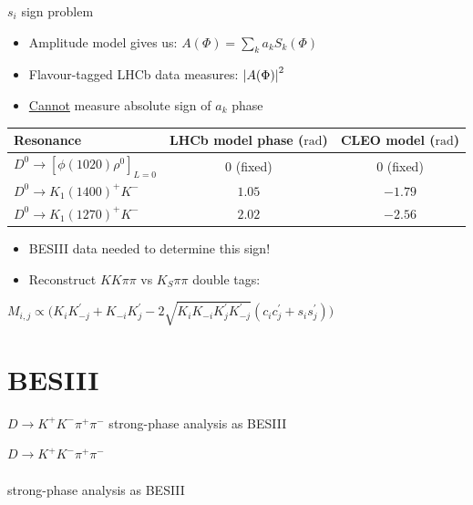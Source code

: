 \documentclass{beamer}
\begin{document}
\begin{frame}{$s_i$ sign problem}
  \begin{itemize}
    \setlength\itemsep{0.5em}
    \item{Amplitude model gives us: $A(\Phi) = \sum_ka_kS_k(\Phi)$}
    \item{Flavour-tagged LHCb data measures: $\abs{A(\Phi)}^2$}
    \item{\underline{Cannot} measure absolute sign of $a_k$ phase}
  \end{itemize}
  \vspace{0.4cm}
  \begin{tabular}{l|c|c}
    Resonance                           & LHCb model phase ($\si{\radian}$) & CLEO model ($\si{\radian}$) \\
    \hline
    $D^0\to[\phi(1020)\rho^0]_{L = 0}$  & $0$ (fixed)                       & $0$ (fixed) \\
    $D^0\to K_1(1400)^+K^-$             & $1.05$                            & $-1.79$ \\
    $D^0\to K_1(1270)^+K^-$             & $2.02$                            & $-2.56$ \\
    \hline
  \end{tabular}
  \vspace{0.4cm}
  \begin{itemize}
    \setlength\itemsep{0.5em}
    \item{BESIII data needed to determine this sign!}
    \item{Reconstruct $KK\pi\pi$ vs $K_S\pi\pi$ double tags:}
  \end{itemize}
  \begin{center}
    $M_{i, j}\propto\big(K_iK^\prime_{-j} + K_{-i}K^\prime_j - 2\sqrt{K_iK_{-i}K^\prime_jK^\prime_{-j}}(c_ic^\prime_j + s_is^\prime_j)\big)$
  \end{center}
\end{frame}

\section{BESIII}

\begin{frame}{$D\to K^+K^-\pi^+\pi^-$ strong-phase analysis as BESIII}
  \begin{center}
    {\huge $D\to K^+K^-\pi^+\pi^-$ \\~\\strong-phase analysis as BESIII}
  \end{center}
\end{frame}
\end{document}
